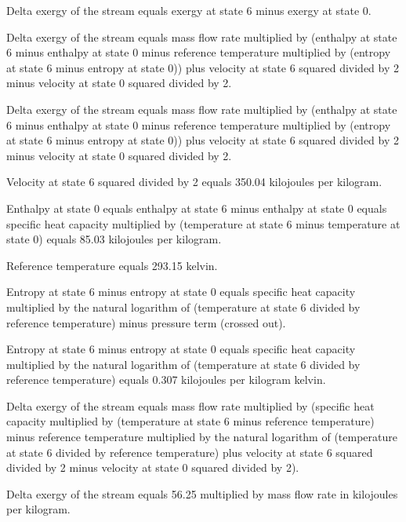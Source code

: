 Delta exergy of the stream equals exergy at state 6 minus exergy at state 0.  

Delta exergy of the stream equals mass flow rate multiplied by (enthalpy at state 6 minus enthalpy at state 0 minus reference temperature multiplied by (entropy at state 6 minus entropy at state 0)) plus velocity at state 6 squared divided by 2 minus velocity at state 0 squared divided by 2.  

Delta exergy of the stream equals mass flow rate multiplied by (enthalpy at state 6 minus enthalpy at state 0 minus reference temperature multiplied by (entropy at state 6 minus entropy at state 0)) plus velocity at state 6 squared divided by 2 minus velocity at state 0 squared divided by 2.  

Velocity at state 6 squared divided by 2 equals 350.04 kilojoules per kilogram.  

Enthalpy at state 0 equals enthalpy at state 6 minus enthalpy at state 0 equals specific heat capacity multiplied by (temperature at state 6 minus temperature at state 0) equals 85.03 kilojoules per kilogram.  

Reference temperature equals 293.15 kelvin.  

Entropy at state 6 minus entropy at state 0 equals specific heat capacity multiplied by the natural logarithm of (temperature at state 6 divided by reference temperature) minus pressure term (crossed out).  

Entropy at state 6 minus entropy at state 0 equals specific heat capacity multiplied by the natural logarithm of (temperature at state 6 divided by reference temperature) equals 0.307 kilojoules per kilogram kelvin.  

Delta exergy of the stream equals mass flow rate multiplied by (specific heat capacity multiplied by (temperature at state 6 minus reference temperature) minus reference temperature multiplied by the natural logarithm of (temperature at state 6 divided by reference temperature) plus velocity at state 6 squared divided by 2 minus velocity at state 0 squared divided by 2).  

Delta exergy of the stream equals 56.25 multiplied by mass flow rate in kilojoules per kilogram.